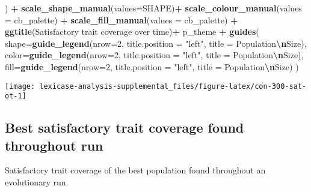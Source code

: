 \documentclass[
]{book}
\newenvironment{Shaded}{\begin{snugshade}}{\end{snugshade}}
\newcommand{\AttributeTok}[1]{\textcolor[rgb]{0.13,0.29,0.53}{#1}}
\newcommand{\DecValTok}[1]{\textcolor[rgb]{0.00,0.00,0.81}{#1}}
\newcommand{\FunctionTok}[1]{\textcolor[rgb]{0.13,0.29,0.53}{\textbf{#1}}}
\newcommand{\NormalTok}[1]{#1}
\newcommand{\SpecialCharTok}[1]{\textcolor[rgb]{0.81,0.36,0.00}{\textbf{#1}}}
\newcommand{\StringTok}[1]{\textcolor[rgb]{0.31,0.60,0.02}{#1}}
\begin{document}
\begin{Shaded}
\begin{Highlighting}[]
\NormalTok{  ) }\SpecialCharTok{+}
  \FunctionTok{scale\_shape\_manual}\NormalTok{(}\AttributeTok{values=}\NormalTok{SHAPE)}\SpecialCharTok{+}
  \FunctionTok{scale\_colour\_manual}\NormalTok{(}\AttributeTok{values =}\NormalTok{ cb\_palette) }\SpecialCharTok{+}
  \FunctionTok{scale\_fill\_manual}\NormalTok{(}\AttributeTok{values =}\NormalTok{ cb\_palette) }\SpecialCharTok{+}
  \FunctionTok{ggtitle}\NormalTok{(}\StringTok{\textquotesingle{}Satisfactory trait coverage over time\textquotesingle{}}\NormalTok{)}\SpecialCharTok{+}
\NormalTok{  p\_theme }\SpecialCharTok{+}
  \FunctionTok{guides}\NormalTok{(}
    \AttributeTok{shape=}\FunctionTok{guide\_legend}\NormalTok{(}\AttributeTok{nrow=}\DecValTok{2}\NormalTok{, }\AttributeTok{title.position =} \StringTok{"left"}\NormalTok{, }\AttributeTok{title =} \StringTok{\textquotesingle{}Population}\SpecialCharTok{\textbackslash{}n}\StringTok{Size\textquotesingle{}}\NormalTok{),}
    \AttributeTok{color=}\FunctionTok{guide\_legend}\NormalTok{(}\AttributeTok{nrow=}\DecValTok{2}\NormalTok{, }\AttributeTok{title.position =} \StringTok{"left"}\NormalTok{, }\AttributeTok{title =} \StringTok{\textquotesingle{}Population}\SpecialCharTok{\textbackslash{}n}\StringTok{Size\textquotesingle{}}\NormalTok{),}
    \AttributeTok{fill=}\FunctionTok{guide\_legend}\NormalTok{(}\AttributeTok{nrow=}\DecValTok{2}\NormalTok{, }\AttributeTok{title.position =} \StringTok{"left"}\NormalTok{, }\AttributeTok{title =} \StringTok{\textquotesingle{}Population}\SpecialCharTok{\textbackslash{}n}\StringTok{Size\textquotesingle{}}\NormalTok{)}
\NormalTok{  )}
\end{Highlighting}
\end{Shaded}

\texttt{[image: lexicase-analysis-supplemental\_files/figure-latex/con-300-sat-ot-1]}

\hypertarget{best-satisfactory-trait-coverage-found-throughout-run-2}{%
\subsection{Best satisfactory trait coverage found throughout run}\label{best-satisfactory-trait-coverage-found-throughout-run-2}}

Satisfactory trait coverage of the best population found throughout an evolutionary run.
\end{document}
